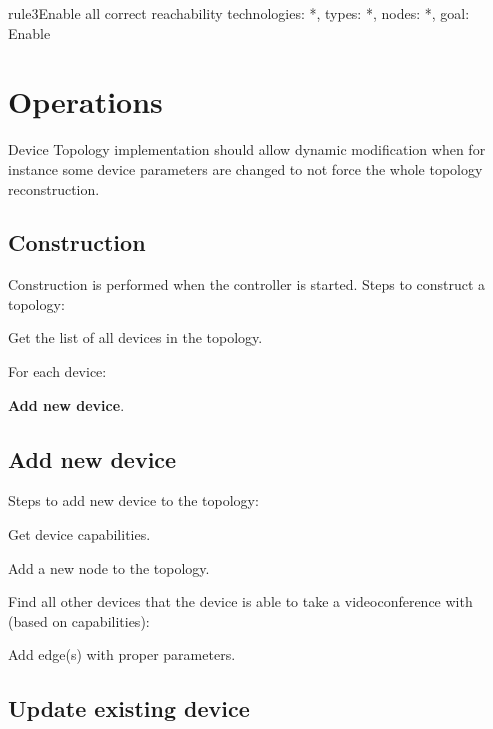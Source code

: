 \begin{EntityExample}{}{rule3}{Enable all correct reachability}
technologies: *,
types: *,
nodes: *,
goal: Enable
\end{EntityExample}

\section{Operations}

Device Topology implementation should allow dynamic modification when for 
instance some device parameters are changed to not force the whole topology 
reconstruction.      
      
\subsection*{Construction}

Construction is performed when the controller is started. Steps to construct a 
topology:

\begin{compactenum}
\item Get the list of all devices in the topology.
\item For each device: 
  \begin{compactitem}
  \item \textbf{Add new device}.
  \end{compactitem}
\end{compactenum}     

\subsection*{Add new device}     

Steps to add new device to the topology:
\begin{compactenum}
\item Get device capabilities.
\item Add a new node to the topology.
\item Find all other devices that the device is able to take a videoconference 
  with (based on capabilities):
  \begin{compactitem}
  \item Add edge(s) with proper parameters.
  \end{compactitem}
\end{compactenum}  

\subsection*{Update existing device}     

